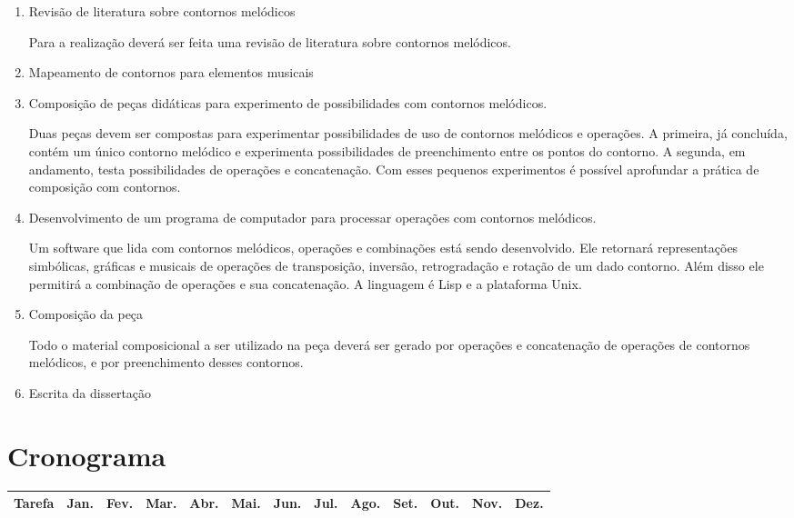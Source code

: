 \documentclass{article}
\begin{document}
\begin{enumerate}
\item Revisão de literatura sobre contornos melódicos

  Para a realização deverá ser feita uma revisão de literatura sobre
  contornos melódicos.

\item Mapeamento de contornos para elementos musicais

\item Composição de peças didáticas para experimento de possibilidades
  com contornos melódicos.

  Duas peças devem ser compostas para experimentar possibilidades de
  uso de contornos melódicos e operações. A primeira, já concluída,
  contém um único contorno melódico e experimenta possibilidades de
  preenchimento entre os pontos do contorno. A segunda, em andamento,
  testa possibilidades de operações e concatenação. Com esses pequenos
  experimentos é possível aprofundar a prática de composição com
  contornos.

\item Desenvolvimento de um programa de computador para processar
  operações com contornos melódicos.

  Um software que lida com contornos melódicos, operações e
  combinações está sendo desenvolvido. Ele retornará representações
  simbólicas, gráficas e musicais de operações de transposição,
  inversão, retrogradação e rotação de um dado contorno. Além disso
  ele permitirá a combinação de operações e sua concatenação. A
  linguagem é Lisp e a plataforma Unix.

  
\item Composição da peça

  Todo o material composicional a ser utilizado na peça deverá ser
  gerado por operações e concatenação de operações de contornos
  melódicos, e por preenchimento desses contornos.

\item Escrita da dissertação
\end{enumerate}

\section{Cronograma}
\label{sec:cronograma}

\begin{table}[h]
  \centering
  \begin{tabular}{lllllllllllll}
    \hline
    Tarefa & Jan. & Fev. & Mar. & Abr. & Mai. & Jun. & Jul. & Ago. & Set. &
    Out. & Nov. & Dez. \\
    \hline


    \hline
  \end{tabular}
  \label{tab:cronograma}
\end{table}
\end{document}
